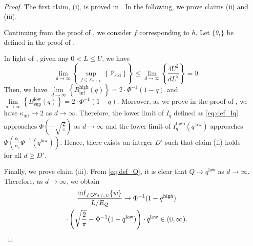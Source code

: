 \documentclass[journal]{IEEEtran}
\renewcommand{\geq}{\geqslant} %
\renewcommand{\leq}{\leqslant} %
\theoremstyle{definition}
\newcommand{\aup}{\alpha_{\uparrow}}
\newcommand{\adown}{\alpha_{\downarrow}}
\begin{document}
\begin{proof}
The first claim, (i), is proved in . In the following, we prove claims (ii) and (iii).

Continuing from the proof of , we consider $f$ corresponding to $h$. Let $\{\theta_t\}$ be defined in the proof of .

In light of ,
given any $0 < L \leq U$,
we have
\begin{equation}
\underset{d\to\infty}{\lim}
\left\{
\underset{f\in\mathcal{S}_{d, L, U}}{\sup}
\left\{
\mathcal{V}_\mathrm{std} 
\right\}
\right\}
\leq 
\underset{d\to\infty}{\lim}
\left\{
\frac{4U^2}{dL^2}
\right\}
= 0
.
\label{eq:tr_cond_asymptotic}
\end{equation}
Then, we have
$
\underset{d\to\infty}{\lim}
\left\{
B_{\inf}^\mathrm{high}(q)
\right\}
= 2\cdot\Phi^{-1}(1-q)
$
and
$
\underset{d\to\infty}{\lim}
\left\{
B_{\sup}^\mathrm{low}(q)
\right\}
= 2\cdot\Phi^{-1}(1-q)
$.
Moreover, as we prove in the proof of , we have
$\kappa_{\inf} \to 2$ as $d\to\infty$.
Therefore, the lower limit of $I_q$ defined as \eqref{eq:def_Iq} approaches $ \Phi\left(-\sqrt{\frac{2}{\pi}}\right)$ as $d\to\infty$ and the lower limit of $I_q^\mathrm{high}(q^\mathrm{low})$ approaches
$\Phi\left( \frac{\adown}{\aup} \Phi^{-1}\left( q^\mathrm{low}\right)\right)$. 
Hence, there exists an integer $D'$ such that claim (ii) holds for all $d \geq D'$.

Finally, we prove claim (iii). 
From \eqref{eq:def_Q}, it is clear that $Q \to q^\text{low}$ as $d\to\infty$.
Therefore, as $d \to \infty$, we obtain
\begin{multline}
\frac{\inf_{f \in \mathcal{S}_{d,L,U}} \{w\}}{L/E_\mathcal{Q}} 
\to 
\Phi^{-1}(1- q^\mathrm{high})
\\
\cdot\left(\sqrt{\frac{2}{\pi}} - \Phi^{-1}(1-q^\mathrm{low})\right) \cdot q^\mathrm{low}
\in (0, \infty).\qedhere
\end{multline}
\end{proof}
\end{document}
